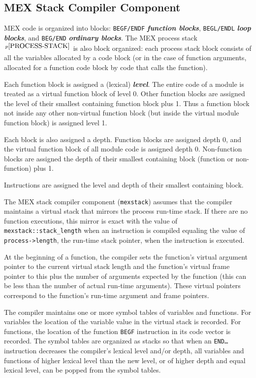 \documentclass[12pt]{article}
\newcommand{\key}[1]{{\bf \em #1}\index{#1}}
\newcommand{\skey}[2]{{\bf \em #1#2}\index{#1}}
\newcommand{\pagnote}[1]{$\,^{p\pageref{#1}}$}
\newcommand{\EOL}{\penalty \exhyphenpenalty}
\begin{document}
\subsection{MEX Stack Compiler Component}
\label{MEX-STACK-COMPILER-COMPONENT}

MEX code is organized into blocks: {\tt BEGF/ENDF} \skey{function block}s,
{\tt BEGL/ENDL} \skey{loop block}s, and {\tt BEG/END} \skey{ordinary block}s.
The MEX process stack\pagnote{PROCESS-STACK} is also block organized:
each process stack block consists of all the variables allocated
by a code block (or in the case of function arguments, allocated for
a function code block by code that calls the function).

Each function block is assigned a (lexical) \key{level}.
The entire code of a module is treated as a virtual function block
of level 0.  Other function blocks are assigned the level of their
smallest containing function block plus 1.  Thus
a function block not inside any other non-virtual function block
(but inside the virtual module function block) is assigned level 1.

Each block is also assigned a depth.  Function blocks are assigned depth
0, and the virtual function block of all module code is assigned depth 0.
Non-function blocks are assigned the depth
of their smallest containing block (function or non-function) plus 1.

Instructions are assigned the level and depth of their smallest containing
block.

The MEX stack compiler component ({\tt mexstack}) assumes that the compiler
maintains a virtual stack that mirrors the process run-time stack.
If there are no function executions, this mirror is exact with the value of
{\tt mexstack::\EOL stack\_\EOL length}
when an instruction is compiled equaling the value of
{\tt process->length}, the run-time stack pointer, when the
instruction is executed.

At the beginning of a function, the compiler sets the
function's virtual argument pointer
to the current virtual stack length and the function's virtual
frame pointer to this plus the number of arguments expected by the
function (this can be less than the number of actual run-time arguments).
These virtual pointers correspond to the function's run-time argument
and frame pointers.

The compiler maintains one or more symbol tables of variables
and functions.  For variables the location of the variable value
in the virtual stack is recorded.  For functions, the location of
the function {\tt BEGF} instruction in its code vector is recorded.
The symbol tables are organized as stacks so that
when an {\tt END\ldots} instruction decreases the compiler's lexical
level and/or depth, all variables and functions of higher lexical level
than the new level, or of higher depth and equal lexical level, can be
popped from the symbol tables.
\end{document}
